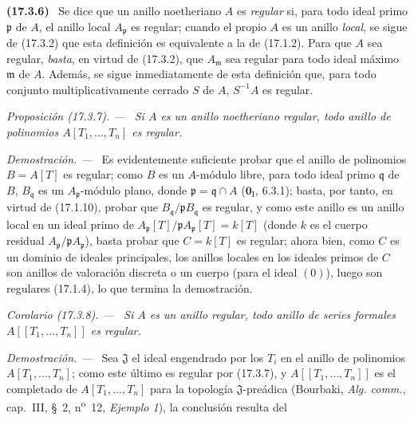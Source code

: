 \documentclass[10pt,oneside]{book}
\makeatletter
\newcommand{\setmanualcurrentlabel}[1]{\def\@currentlabel{#1}}
\newenvironment{env}[1][]{\setmanualcurrentlabel{#1}\par\medskip\noindent\textbf{(#1)}\ }{\par}
\newenvironment{proposition}[1][]{%
  \setmanualcurrentlabel{#1}\par\medskip\noindent\itshape Proposición (#1). ---\ }{\par}
\newenvironment{corollary}[1][]{%
  \setmanualcurrentlabel{#1}\par\medskip\noindent\itshape Corolario (#1). ---\ }{\par}
\newenvironment{proof}{%
  \par\medskip\noindent\textit{Demostración. ---\ }}{\par}
\makeatother
\begin{document}
\begin{env}[17.3.6]
\label{0.17.3.6-es}
Se dice que un anillo noetheriano $A$ es \emph{regular} si, para todo ideal
primo $\mathfrak{p}$ de $A$, el anillo local $A_{\mathfrak{p}}$ es regular;
cuando el propio $A$ es un anillo \emph{local}, se sigue de (17.3.2) que esta
definición es equivalente a la de (17.1.2). Para que $A$ sea regular, \emph{basta},
en virtud de (17.3.2), que $A_{\mathfrak{m}}$ sea regular para todo ideal
máximo $\mathfrak{m}$ de $A$. Además, se sigue inmediatamente de esta
definición que, para todo conjunto multiplicativamente cerrado $S$ de $A$,
$S^{-1}A$ es regular.
\end{env}

\begin{proposition}[17.3.7]
\label{0.17.3.7-es}
Si $A$ es un anillo noetheriano regular, todo anillo de polinomios
$A[T_1,\ldots,T_n]$ es regular.
\end{proposition}

\begin{proof}
Es evidentemente suficiente probar que el anillo de polinomios $B=A[T]$ es
regular; como $B$ es un $A$-módulo libre, para todo ideal primo
$\mathfrak{q}$ de $B$, $B_{\mathfrak{q}}$ es un
$A_{\mathfrak{p}}$-módulo plano, donde $\mathfrak{p}=\mathfrak{q}\cap A$
($\mathbf{0}_{\mathrm I}$, 6.3.1); basta, por tanto, en virtud de (17.1.10), probar que
$B_{\mathfrak{q}}/\mathfrak{p}B_{\mathfrak{q}}$ es regular, y como este anillo
es un anillo local en un ideal primo de
$A_{\mathfrak{p}}[T]/\mathfrak{p}A_{\mathfrak{p}}[T]=k[T]$ (donde $k$ es el
cuerpo residual $A_{\mathfrak{p}}/\mathfrak{p}A_{\mathfrak{p}}$), basta
probar que $C=k[T]$ es regular; ahora bien, como $C$ es un dominio de ideales
principales, los anillos locales en los ideales primos de $C$ son anillos de
valoración discreta o un cuerpo (para el ideal $(0)$), luego son regulares
(17.1.4), lo que termina la demostración.
\end{proof}

\begin{corollary}[17.3.8]
\label{0.17.3.8-es}
Si $A$ es un anillo regular, todo anillo de series formales
$A[[T_1,\ldots,T_n]]$ es regular.
\end{corollary}

\begin{proof}
Sea $\mathfrak{J}$ el ideal engendrado por los $T_i$ en el anillo de polinomios
$A[T_1,\ldots,T_n]$; como este último es regular por (17.3.7), y
$A[[T_1,\ldots,T_n]]$ es el completado de $A[T_1,\ldots,T_n]$ para la
topología $\mathfrak{J}$-preádica (Bourbaki, \emph{Alg. comm.}, cap.~III,
\S~2, n\textsuperscript{o}~12, \emph{Ejemplo 1}), la conclusión resulta del
\end{proof}
\end{document}
